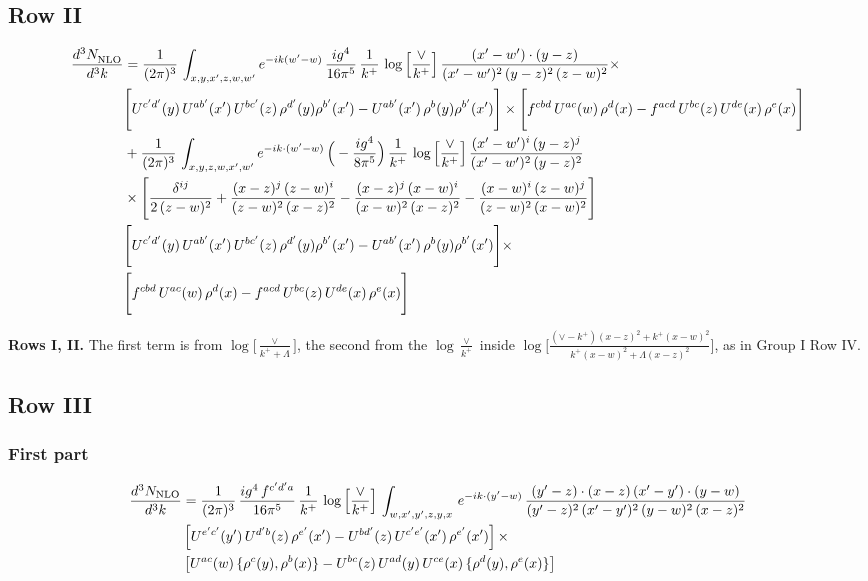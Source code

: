\documentclass[9pt]{article}
\numberwithin{equation}{section}
\begin{document}
\subsection{Row II}
\begin{align}
     \frac{d^{3}N_{\rm NLO}^{\rm}}{d^{3}k}  & =  \frac{1}{(2\pi)^{3}}\, \int_{x,y,x',z,w,w^{\prime}} e^{-ik(w^{\prime}-w)}\, \frac{ig^{4}}{16\pi^{5}}\,\frac{1}{k^{+}}\,\log{\left[\frac{\vee}{k^{+}}\right]}\, \frac{(x'-w')\cdot (y-z)}{(x'-w')^{2}\,(y-z)^{2}\,(z-w)^{2}}\times\,\notag \\ & \Bigg[U^{c'd'}(y)\,U^{ab'}(x')\,U^{bc'}(z)\,\rho^{d'}(y)\rho^{b'}(x')-U^{ab'}(x')\,\rho^{b}(y)\rho^{b'}(x')\Bigg]\times \Bigg[f^{cbd}\,U^{ac}(w)\,\rho^{d}(x)-f^{acd}\, U^{bc}(z)\,U^{de}(x)\,\rho^{e}(x)\Bigg]
\notag \\ & +\frac{1}{(2\pi)^{3}}\,\int_{x,y,z,w,x',w'}e^{-ik\cdot (w^\prime-w)}\,\Big(-\frac{ig^{4}}{8\pi^{5}}\Big)\,\frac{1}{k^{+}}\,\log{\left[\frac{\vee}{k^{+}}\right]}\,\frac{(x'-w')^{i}\,(y-z)^{j}}{(x'-w')^{2}\,(y-z)^{2}}\notag \\ & \times \Bigg[\frac{\delta^{ij}}{2\,(z-w)^{2}}+\frac{(x-z)^{j}\,(z-w)^{i}}{(z-w)^{2}\,(x-z)^{2}}-\frac{(x-z)^{j}\,(x-w)^{i}}{(x-w)^{2}\,(x-z)^{2}}-\frac{(x-w)^{i}\,(z-w)^{j}}{(z-w)^{2}\,(x-w)^{2}}\Bigg]\notag \\ & \Bigg[U^{c'd'}(y)\,U^{ab'}(x')\,U^{bc'}(z)\,\rho^{d'}(y)\rho^{b'}(x')-U^{ab'}(x')\,\rho^{b}(y)\rho^{b'}(x')\Bigg]\times\notag \\ & \Bigg[f^{cbd}\,U^{ac}(w)\,\rho^{d}(x)-f^{acd}\, U^{bc}(z)\,U^{de}(x)\,\rho^{e}(x)\Bigg]
\end{align}

\textbf{Rows I, II.} The first term is from $\log\big[\frac{\vee}{k^++\Lambda}\big]$, the second from the $\log\frac{\vee}{k^+}$ inside $\log\Big[\frac{(\vee-k^{+})(x-z)^{2}+k^{+}(x-w)^{2}}{k^{+}(x-w)^{2}+\Lambda(x-z)^{2}}\Big]$, as in Group I Row IV.
 \subsection{Row III}
 \subsubsection{First part}
 


\begin{align}
\frac{d^{3}N_{\rm NLO}}{d^{3}k} & = \frac{1}{(2\pi)^{3}}\, \frac{ig^{4}\,f^{c'd'a}}{16\pi^{5}}\, \frac{1}{k^{+}}\,\log{\left[\frac{\vee}{k^{+}}\right]}\,\int_{w,x',y',z,y,x}\, e^{-ik\cdot (y'-w)}\,\frac{(y'-z)\cdot (x-z)\,(x'-y')\cdot (y-w)}{(y'-z)^{2}\,(x'-y')^{2}\,(y-w)^{2}\,(x-z)^{2}}\notag \\
& \left[U^{e'c'}(y')\,U^{d'b}(z)\,\rho^{e'}(x')-U^{bd'}(z)\,U^{c'e'}(x')\,\rho^{e'}(x')\right]\times\notag \\
& \left[U^{ac}(w)\, \{\rho^{c}(y),\rho^{b}(x)\}-U^{bc}(z)\,U^{ad}(y)\,U^{ce}(x)\,\{\rho^{d}(y),\rho^{e}(x)\}\right]
\end{align}
\end{document}
